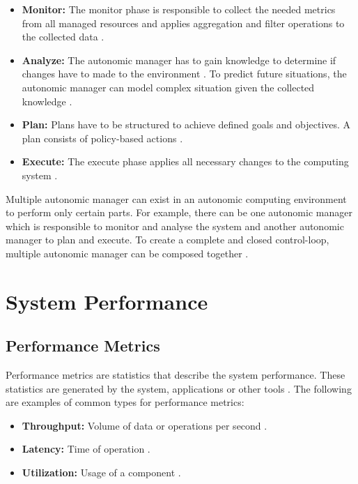\begin{itemize}
\item \textbf{Monitor:}
The monitor phase is responsible to collect the needed metrics from all managed resources and applies aggregation and filter operations to the collected data \cite{Sinreich2006AnAB}.

\item \textbf{Analyze:}
The autonomic manager has to gain knowledge to determine if changes have to made to the environment \cite{Sinreich2006AnAB}. To predict future situations, the autonomic manager can model complex situation given the collected knowledge \cite{Jacob2004AutonomicSolution}.

\item \textbf{Plan:}
Plans have to be structured to achieve defined goals and objectives. A plan consists of policy-based actions \cite{Jacob2004AutonomicSolution, Sinreich2006AnAB}.

\item \textbf{Execute:}
The execute phase applies all necessary changes to the computing system \cite{Sinreich2006AnAB}.
\end{itemize}

Multiple autonomic manager can exist in an autonomic computing environment to perform only certain parts. For example, there can be one autonomic manager which is responsible to monitor and analyse the system and another autonomic manager to plan and execute. To create a complete and closed control-loop, multiple autonomic manager can be composed together \cite{Sinreich2006AnAB}.


\section{System Performance}


\subsection{Performance Metrics}
Performance metrics are statistics that describe the system performance. These statistics are generated by the system, applications or other tools \cite{Greg2020SysPerf}.
The following are examples of common types for performance metrics:
\begin{itemize}
\item \textbf{Throughput:} Volume of data or operations per second \cite{Greg2020SysPerf}.
\item \textbf{Latency:} Time of operation \cite{Greg2020SysPerf}.
\item \textbf{Utilization:} Usage of a component \cite{Greg2020SysPerf}.
\end{itemize}


